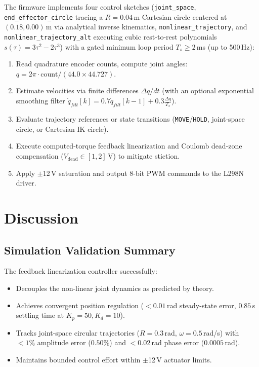 \documentclass[conference]{IEEEtran}
\begin{document}
The firmware implements four control sketches (\texttt{joint\_space}, \texttt{end\_effector\_circle} tracing a $R = 0.04$\,m Cartesian circle centered at $(0.18, 0.00)$\,m via analytical inverse kinematics, \texttt{nonlinear\_trajectory}, and \texttt{nonlinear\_trajectory\_alt} executing cubic rest-to-rest polynomials $s(\tau) = 3\tau^2 - 2\tau^3$) with a gated minimum loop period $T_s \ge 2$\,ms (up to 500\,Hz):
\begin{enumerate}
\item Read quadrature encoder counts, compute joint angles: $q = 2\pi \cdot \text{count} / (44.0 \times 44.727)$.
\item Estimate velocities via finite differences $\Delta q / dt$ (with an optional exponential smoothing filter $\dot{q}_{filt}[k] = 0.7\dot{q}_{filt}[k{-}1] + 0.3\frac{\Delta q}{T_s}$).
\item Evaluate trajectory references or state transitions (\texttt{MOVE}/\texttt{HOLD}, joint-space circle, or Cartesian IK circle).
\item Execute computed-torque feedback linearization and Coulomb dead-zone compensation ($V_{\text{dead}} \in [1, 2]$\,V) to mitigate stiction.
\item Apply $\pm$12\,V saturation and output 8-bit PWM commands to the L298N driver.
\end{enumerate}

\section{Discussion}
\label{sec:discussion}

\subsection{Simulation Validation Summary}

The feedback linearization controller successfully:
\begin{itemize}
\item Decouples the non-linear joint dynamics as predicted by theory.
\item Achieves convergent position regulation ($< 0.01$\,rad steady-state error, $0.85$\,s settling time at $K_p = 50, K_d = 10$).
\item Tracks joint-space circular trajectories ($R = 0.3$\,rad, $\omega = 0.5$\,rad/s) with $< 1\%$ amplitude error ($0.50\%$) and $< 0.02$\,rad phase error ($0.0005$\,rad).
\item Maintains bounded control effort within $\pm$12\,V actuator limits.
\end{itemize}
\end{document}
